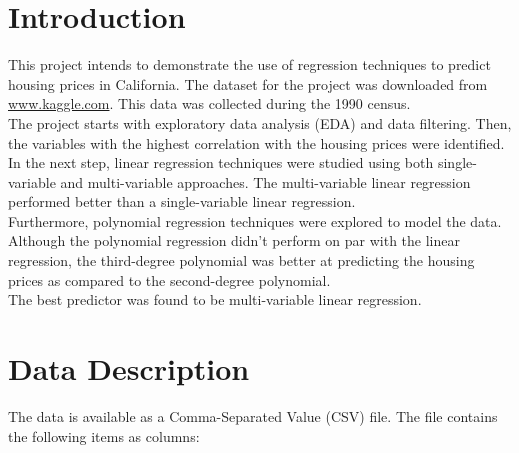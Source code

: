 
\chapter{Introduction}
This project intends to demonstrate the use of regression techniques to predict housing prices in California. The dataset for the project was downloaded from \href{https://www.kaggle.com/datasets/camnugent/california-housing-prices/data}{www.kaggle.com}. This data was collected during the 1990 census.\\

The project starts with exploratory data analysis (EDA) and data filtering. Then, the variables with the highest correlation with the housing prices were identified. In the next step, linear regression techniques were studied using both single-variable and multi-variable approaches. The multi-variable linear regression performed better than a single-variable linear regression.\\


Furthermore, polynomial regression techniques were explored to model the data. Although the polynomial regression didn't perform on par with the linear regression, the third-degree polynomial was better at predicting the housing prices as compared to the second-degree polynomial.\\

The best predictor was found to be multi-variable linear regression.


\chapter{Data Description}
The data is available as a Comma-Separated Value (CSV) file. The file contains the following items as columns:

